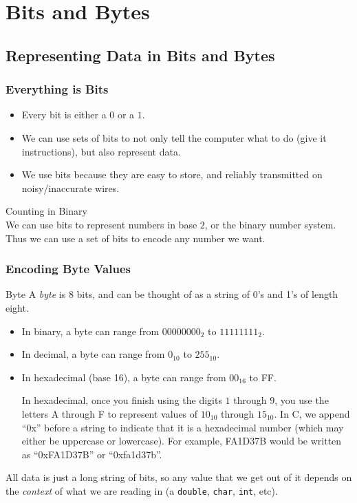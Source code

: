 \documentclass[class=article, crop=false]{standalone}
\begin{document}
  \section{Bits and Bytes}
  \subsection{Representing Data in Bits and Bytes}
  \subsubsection{Everything is Bits}
  \begin{itemize}
    \item Every bit is either a $0$ or a $1$.
    \item We can use sets of bits to not only tell the computer what to do (give it instructions), but also represent data.
    \item We use bits because they are easy to store, and reliably transmitted on noisy/inaccurate wires.
  \end{itemize}
  \begin{example}{Counting in Binary} \\
    We can use bits to represent numbers in base $2$, or the binary number system. Thus we can use a set of bits to encode any number we want.
  \end{example}
  \subsubsection{Encoding Byte Values}
  \begin{definition}{Byte}
    A \emph{byte} is $8$ bits, and can be thought of as a string of 0's and 1's of length eight.
  \end{definition}
  \begin{itemize}
    \item In binary, a byte can range from $00000000_2$ to $11111111_2$.
    \item In decimal, a byte can range from $0_{10}$ to $255_{10}$.
    \item In hexadecimal (base 16), a byte can range from $00_{16}$ to FF.
    \begin{note}{}
      In hexadecimal, once you finish using the digits $1$ through $9$, you use the letters A through F to represent values of $10_{10}$ through $15_{10}$. In C, we append ``0x'' before a string to indicate that it is a hexadecimal number (which may either be uppercase or lowercase). For example, FA1D37B would be written as ``0xFA1D37B'' or ``0xfa1d37b''.
    \end{note}
  \end{itemize}
  All data is just a long string of bits, so any value that we get out of it depends on the \emph{context} of what we are reading in (a \texttt{double}, \texttt{char}, \texttt{int}, etc).
\end{document}
